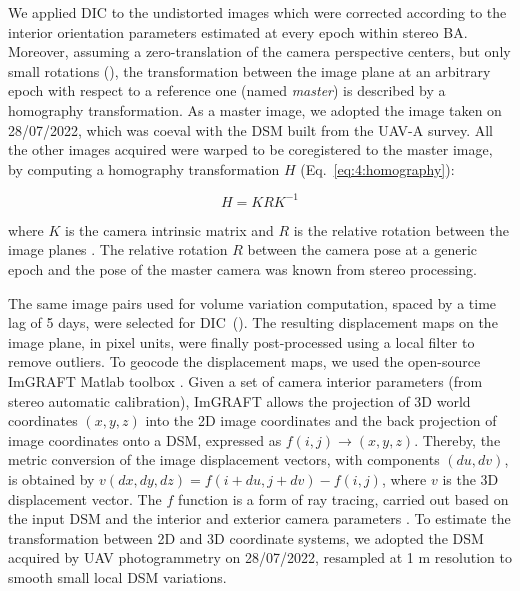 We applied DIC to the undistorted images which were corrected according to the interior
orientation parameters estimated at every epoch within stereo BA.
Moreover, assuming a zero-translation of the camera perspective centers, but only small
rotations (), the transformation between the image plane at an
arbitrary epoch with respect to a reference one (named \textit{master}) is
described by a homography transformation.
As a master image, we adopted the image taken on 28/07/2022, which was
coeval with the DSM built from the UAV-A survey.
All the other images acquired were warped to be coregistered to the master image,
by computing a homography transformation \(H\) (Eq.~\ref{eq:4:homography}):

\begin{equation}
  H = KRK^{-1}
  \label{eq:4:homography}
\end{equation}

where \(K\) is the camera intrinsic matrix and \(R\) is the relative
rotation between the image planes \citep{forstner2016}.
The relative rotation \(R\) between the camera pose at a generic epoch and the pose of
the master camera was known from stereo processing.

The same image pairs used for volume  variation computation, spaced by a time lag of 5
days, were selected for DIC~().
The resulting displacement maps on the image plane, in pixel units, were finally
post-processed using a local filter to remove outliers.
To geocode the displacement maps, we used the open-source ImGRAFT Matlab toolbox
\citep{Messerli2015}.
Given a set of camera interior parameters (from stereo automatic calibration), ImGRAFT
allows the projection of 3D world coordinates \((x,y,z)\) into the 2D image coordinates
and the back projection of image coordinates onto a DSM, expressed as \(f(i,j) \to
(x,y,z)\). Thereby, the metric conversion of the image displacement vectors, with
components \((du,dv)\), is obtained by \(v(dx,dy,dz) = f(i+du,j+dv)-f(i,j)\), where
\(v\) is the 3D displacement vector. The \(f\) function is a form of ray tracing, carried
out based on the input DSM and the interior and exterior camera parameters
\citep{Messerli2015}.
To estimate the transformation between 2D and 3D coordinate systems,
we adopted the DSM acquired by UAV photogrammetry on 28/07/2022,
resampled at 1 m resolution to smooth small local DSM variations.

